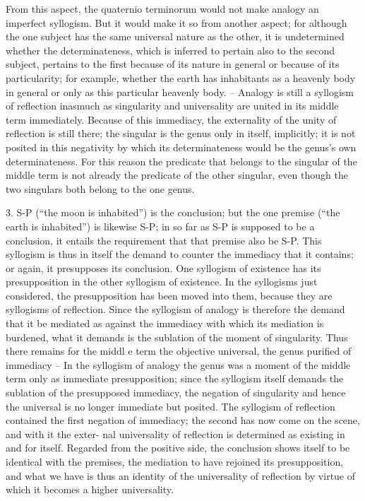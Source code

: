 From this aspect, the quaternio terminorum would not make analogy
an imperfect syllogism. But it would make it so from another aspect;
for
although the one subject has the same universal nature as the other, it is
undetermined whether the determinateness, which is inferred to pertain
also to the second subject, pertains to the first because of its nature in
general or because of its particularity; for example, whether the earth has
inhabitants as a heavenly body in general or only as this particular heavenly
body. –
 Analogy is still a syllogism of reflection inasmuch as singularity
and universality are united in its middle term immediately.
 Because of this
immediacy, the externality of the unity of reflection is still there;
the singular
is the genus only in itself, implicitly;
 it is not posited in this negativity by
which its determinateness would be the genus's own determinateness.
 For
this reason the predicate that belongs to the singular of the middle term
is not already the predicate of the other singular, even though the two
singulars both belong to the one genus.

3. S-P (“the moon is inhabited”) is the conclusion;
but the one premise (“the earth is inhabited”) is likewise S-P;
in so far as S-P is supposed to be a conclusion,
it entails the requirement that that premise also be S-P.
This syllogism is thus in itself the demand
to counter the immediacy that it contains;
or again, it presupposes its conclusion.
One syllogism of existence has its presupposition
in the other syllogism of existence.
In the syllogisms just considered,
the presupposition has been moved into them,
because they are syllogisms of reflection.
Since the syllogism of analogy is therefore
the demand that it be mediated as against the immediacy
with which its mediation is burdened,
what it demands is the sublation of the moment of singularity.
 Thus there remains for the middl
 e term the objective universal,
the genus purified of immediacy
 – In the syllogism of analogy the genus
was a moment of the middle term only as immediate presupposition;
since
the syllogism itself demands the sublation of the presupposed immediacy,
the negation of singularity and hence the universal is no longer immediate
but posited.
 The syllogism of reflection contained the first negation of
immediacy; the second has now come on the scene, and with it the exter-
nal universality of reflection is determined as existing in and for itself.
Regarded from the positive side, the conclusion shows itself to be identical
with the premises, the mediation to have rejoined its presupposition, and
what we have is thus an identity of the universality of reflection by virtue
of which it becomes a higher universality.

